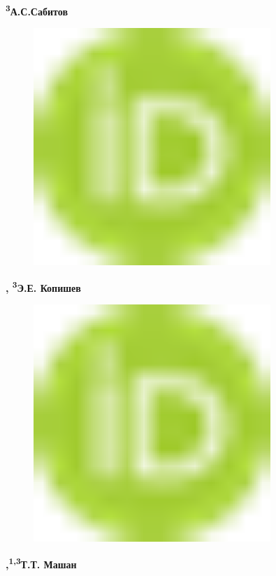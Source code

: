 {\bfseries \textsuperscript{3}А.С.Сабитов}
\begin{figure}[H]
	\centering
	\includegraphics[width=0.8\textwidth]{media/chem2/image1}
	\caption*{}
\end{figure}
{\bfseries ,
\textsuperscript{3}Э.Е.
Копишев}
\begin{figure}[H]
	\centering
	\includegraphics[width=0.8\textwidth]{media/chem2/image1}
	\caption*{}
\end{figure}
{\bfseries ,\textsuperscript{1,3}Т.Т.
Машан}
